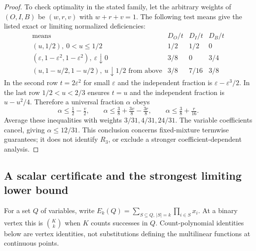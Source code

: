 \begin{proof}
To check optimality in the stated family, let the arbitrary weights of
$(O,I,B)$ be $(w,r,v)$ with $w+r+v=1$. The following test means give the
listed exact or limiting normalized deficiencies:
\[
\begin{array}{c|ccc}
\text{means}&D_O/t&D_I/t&D_B/t\\\hline
(u,1/2),\ 0<u\le1/2&1/2&1/2&0\\
(\varepsilon,1-\varepsilon^2,1-\varepsilon^2),\ \varepsilon\downarrow0
 &3/8&0&3/4\\
(u,1-u/2,1-u/2),\ u\downarrow1/2\text{ from above}&3/8&7/16&3/8
\end{array}
\]
In the second row $t=2\varepsilon^2$ for small $\varepsilon$ and the
independent fraction is $\varepsilon-\varepsilon^3/2$. In the last row
$1/2<u<2/3$ ensures $t=u$ and the independent fraction is $u-u^2/4$.
Therefore a universal fraction $\alpha$ obeys
\[
 \alpha\le\tfrac12-\tfrac v2,\qquad
 \alpha\le\tfrac38+\tfrac{3v}8-\tfrac{3r}8,\qquad
 \alpha\le\tfrac38+\tfrac r{16}.
\]
Average these inequalities with weights $3/31,4/31,24/31$. The variable
coefficients cancel, giving $\alpha\le12/31$.
This conclusion concerns fixed-mixture termwise guarantees; it does not
identify $R_3$, or exclude a stronger coefficient-dependent analysis.
\end{proof}

\subsection{A scalar certificate and the strongest limiting lower bound}
For a set $Q$ of variables, write
$E_k(Q)=\sum_{S\subseteq Q,\,|S|=k}\prod_{i\in S}x_i$.
At a binary vertex this is $\binom{K}{k}$ when $K$ counts successes in
$Q$. Count-polynomial identities below are vertex identities, not
substitutions defining the multilinear functions at continuous points.

